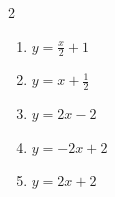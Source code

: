 \documentclass[12pt, a4paper, brazil]{abntex2}
\begin{document}
\begin{multicols*}{2}
\begin{enumerate}
            \begin{enumerate}
                \item $\displaystyle y = \frac{x}{2} + 1$ \vspace{2pt}
                \item $\displaystyle y = x + \frac{1}{2}$ \vspace{6pt}
                \item $\displaystyle y = 2x - 2$ \vspace{2pt}
                \item $\displaystyle y = -2x + 2$ \vspace{2pt}
                \item $\displaystyle y = 2x+2$
            \end{enumerate}
    \end{enumerate}
  \end{multicols*}
\end{document}
